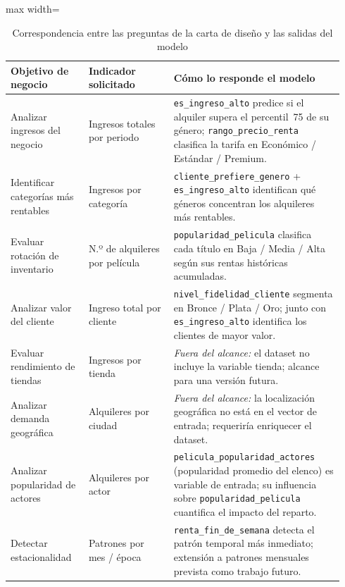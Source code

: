\documentclass[12pt, a4paper]{report}
\newcommand{\variable}[1]{\texttt{\small #1}}
\begin{document}
\begin{table}[H]
\centering
\caption{Correspondencia entre las preguntas de la carta de diseño y las salidas del modelo}
\label{tab:preguntas-negocio}
\small
\begin{adjustbox}{max width=\linewidth}
\begin{tabular}{@{} p{0.22\linewidth} p{0.24\linewidth} p{0.48\linewidth} @{}}
\toprule
\textbf{Objetivo de negocio} & \textbf{Indicador solicitado} & \textbf{Cómo lo responde el modelo} \\
\midrule
Analizar ingresos del negocio &
  Ingresos totales por periodo &
  \variable{es\_ingreso\_alto} predice si el alquiler supera el percentil~75 de su género; \variable{rango\_precio\_renta} clasifica la tarifa en Económico / Estándar / Premium. \\

Identificar categorías más rentables &
  Ingresos por categoría &
  \variable{cliente\_prefiere\_genero} + \variable{es\_ingreso\_alto} identifican qué géneros concentran los alquileres más rentables. \\

Evaluar rotación de inventario &
  N.º de alquileres por película &
  \variable{popularidad\_pelicula} clasifica cada título en Baja / Media / Alta según sus rentas históricas acumuladas. \\

Analizar valor del cliente &
  Ingreso total por cliente &
  \variable{nivel\_fidelidad\_cliente} segmenta en Bronce / Plata / Oro; junto con \variable{es\_ingreso\_alto} identifica los clientes de mayor valor. \\

Evaluar rendimiento de tiendas &
  Ingresos por tienda &
  \textit{Fuera del alcance:} el dataset no incluye la variable tienda; alcance para una versión futura. \\

Analizar demanda geográfica &
  Alquileres por ciudad &
  \textit{Fuera del alcance:} la localización geográfica no está en el vector de entrada; requeriría enriquecer el dataset. \\

Analizar popularidad de actores &
  Alquileres por actor &
  \variable{pelicula\_popularidad\_actores} (popularidad promedio del elenco) es variable de entrada; su influencia sobre \variable{popularidad\_pelicula} cuantifica el impacto del reparto. \\

Detectar estacionalidad &
  Patrones por mes / época &
  \variable{renta\_fin\_de\_semana} detecta el patrón temporal más inmediato; extensión a patrones mensuales prevista como trabajo futuro. \\

\bottomrule
\end{tabular}
\end{adjustbox}
\end{table}
\end{document}
